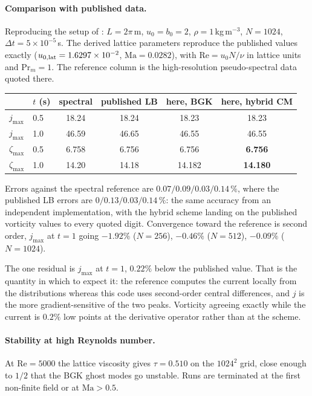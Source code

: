 \documentclass[11pt,a4paper]{article}
\begin{document}
\paragraph{Comparison with published data.}
Reproducing the setup of \cite{derosis2018}: $L=2\pi$\,m, $u_0=b_0=2$,
$\rho=1$\,kg\,m$^{-3}$, $N=1024$, $\Delta t=5\times10^{-5}$\,s. The derived lattice
parameters reproduce the published values exactly
($u_{0,\rm lat}=1.6297\times10^{-2}$, $\mathrm{Ma}=0.0282$), with
$\mathrm{Re}=u_0N/\nu$ in lattice units and $\mathrm{Pr}_m=1$. The reference
column is the high-resolution pseudo-spectral data quoted there.

\begin{center}\small
\begin{tabular}{llcccc}
\toprule
 & $t$ (s) & spectral & published LB & here, BGK & here, hybrid CM \\
\midrule
$j_{\max}$    & 0.5 & 18.24 & 18.24 & 18.23 & 18.23 \\
$j_{\max}$    & 1.0 & 46.59 & 46.65 & 46.55 & 46.55 \\
$\zeta_{\max}$& 0.5 & 6.758 & 6.756 & 6.756 & \textbf{6.756} \\
$\zeta_{\max}$& 1.0 & 14.20 & 14.18 & 14.182 & \textbf{14.180} \\
\bottomrule
\end{tabular}
\end{center}

\noindent Errors against the spectral reference are
$0.07 / 0.09 / 0.03 / 0.14\,\%$, where the published LB errors are
$0 / 0.13 / 0.03 / 0.14\,\%$: the same accuracy from an independent
implementation, with the hybrid scheme landing on the published vorticity values
to every quoted digit. Convergence toward the reference is second order, $j_{\max}$
at $t=1$ going $-1.92\%$ ($N=256$), $-0.46\%$ ($N=512$), $-0.09\%$ ($N=1024$).

The one residual is $j_{\max}$ at $t=1$, $0.22\%$ below the published value. That
is the quantity in which to expect it: the reference computes the current locally
from the distributions whereas this code uses second-order central differences,
and $j$ is the more gradient-sensitive of the two peaks. Vorticity agreeing
exactly while the current is $0.2\%$ low points at the derivative operator rather
than at the scheme.

\paragraph{Stability at high Reynolds number.}
At $\mathrm{Re}=5000$ the lattice viscosity gives $\tau=0.510$ on the $1024^2$
grid, close enough to $1/2$ that the BGK ghost modes go unstable. Runs are
terminated at the first non-finite field or at $\mathrm{Ma}>0.5$.
\end{document}
